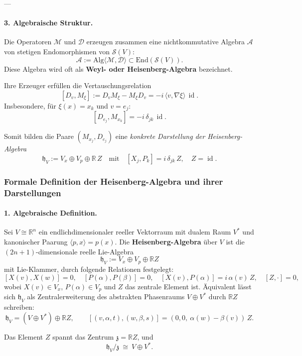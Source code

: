\documentclass[10pt, letterpaper]{article}
\newcommand{\id}{\operatorname{id}}
\newcommand{\R}{\mathbb{R}}
\newcommand{\Alg}{\mathrm{Alg}}
\newcommand{\End}{\mathrm{End}}
\begin{document}
---

\paragraph{3. Algebraische Struktur.}

Die Operatoren $\mathcal{M}$ und $\mathcal{D}$ erzeugen zusammen eine nichtkommutative
Algebra $\mathcal{A}$ von stetigen Endomorphismen von $\mathcal{S}(V)$:
\[
\mathcal{A}:=\Alg\langle \mathcal{M},\mathcal{D}\rangle
\subset \End(\mathcal{S}(V)).
\]
Diese Algebra wird oft als \textbf{Weyl- oder Heisenberg-Algebra} bezeichnet.

Ihre Erzeuger erfüllen die Vertauschungsrelation
\[
[D_v,M_\xi]:=D_v M_\xi - M_\xi D_v = -i\,\langle v,\nabla\xi\rangle\,\id.
\]
Insbesondere, für $\xi(x)=x_k$ und $v=e_j$:
\[
[D_{e_j},M_{x_k}]=-i\,\delta_{jk}\,\id.
\]

Somit bilden die Paare $(M_{x_j},D_{e_j})$ eine
\emph{konkrete Darstellung der Heisenberg-Algebra}
\[
\mathfrak{h}_V:=V_x\oplus V_p\oplus\R\,Z
\quad\text{mit}\quad
[X_j,P_k]=i\,\delta_{jk}\,Z,\quad Z=\id.
\]


\subsubsection{Formale Definition der Heisenberg-Algebra und ihrer Darstellungen}

\paragraph{1. Algebraische Definition.}
Sei $V\cong\R^n$ ein endlichdimensionaler reeller Vektorraum mit dualem Raum $V^\ast$ und
kanonischer Paarung $\langle p,x\rangle=p(x)$.  
Die \textbf{Heisenberg-Algebra} über $V$ ist die $(2n+1)$-dimensionale reelle Lie-Algebra
\[
\mathfrak{h}_V := V_x \oplus V_p \oplus \R Z
\]
mit Lie-Klammer, durch folgende Relationen festgelegt:
\[
[X(v),X(w)]=0,\quad [P(\alpha),P(\beta)]=0,\quad
[X(v),P(\alpha)] = i\,\alpha(v)\,Z,\quad [Z, \cdot]=0,
\]
wobei $X(v)\in V_x$, $P(\alpha)\in V_p$ und $Z$ das zentrale Element ist.
Äquivalent lässt sich $\mathfrak{h}_V$ als Zentralerweiterung des
abstrakten Phasenraums $V\oplus V^\ast$ durch $\R Z$ schreiben:
\[
\mathfrak{h}_V = (V\oplus V^\ast)\oplus \R Z,\qquad
[(v,\alpha,t),(w,\beta,s)] = (0,0,\ \alpha(w)-\beta(v))\,Z.
\]

Das Element $Z$ spannt das Zentrum $\mathfrak{z}=\R Z$, und
\[
\mathfrak{h}_V/\mathfrak{z}\ \cong\ V\oplus V^\ast.
\]
\end{document}

